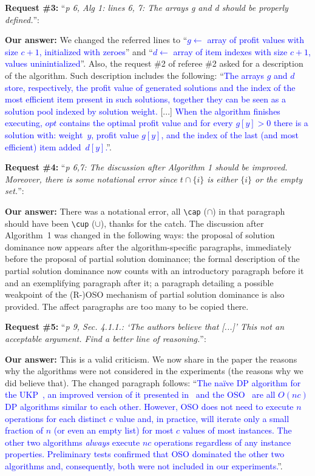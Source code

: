 \documentclass{elsarticle}
\begin{document}
\textbf{Request \#3:} ``\textit{p 6, Alg 1: lines 6, 7: The arrays g and d should be properly defined.}'':

\textbf{Our answer:} We changed the referred lines to ``\textcolor{blue}{\(g \leftarrow\) array of profit values with size \(c + 1\), initialized with zeroes}'' and ``\textcolor{blue}{\(d \leftarrow\) array of item indexes with size \(c + 1\), values uninintialized}''.
Also, the request \#2 of referee \#2 asked for a description of the algorithm.
Such description includes the following: ``\textcolor{blue}{The arrays \(g\) and \(d\) store, respectively, the profit value of generated solutions and the index of the most efficient item present in such solutions, together they can be seen as a solution pool indexed by solution weight.} [...] \textcolor{blue}{When the algorithm finishes executing, \(opt\) contains the optimal profit value and for every \(g[y] > 0\) there is a solution with: weight~\(y\), profit value \(g[y]\), and the index of the last (and most efficient) item added~\(d[y]\).}''.
\medskip

\textbf{Request \#4:} ``\textit{p 6,7: The discussion after Algorithm 1 should be improved. Moreover, there is some notational error since \(t \cap \{i\}\)  is either \(\{i\}\) or the empty set.}'':

\textbf{Our answer:} There was a notational error, all \verb+\cap+ (\(\cap\)) in that paragraph should have been \verb+\cup+ (\(\cup\)), thanks for the catch. The discussion after Algorithm~1 was changed in the following ways: the proposal of solution dominance now appears after the algorithm-specific paragraphs, immediately before the proposal of partial solution dominance; the formal description of the partial solution dominance now counts with an introductory paragraph before it and an exemplifying paragraph after it; a paragraph detailing a possible weakpoint of the (R-)OSO mechanism of partial solution dominance is also provided. The affect paragraphs are too many to be copied there.
\medskip

\textbf{Request \#5:} ``\textit{p 9, Sec. 4.1.1.: `The authors believe that [...]' This not an acceptable argument. Find a better line of reasoning.}'':

\textbf{Our answer:} This is a valid criticism.
We now share in the paper the reasons why the algorithms were not considered in the experiments (the reasons why we did believe that).
The changed paragraph follows: ``\textcolor{blue}{The naïve DP algorithm for the UKP~\cite[p.~311]{tchu}, an improved version of it presented in~\cite[p.~221]{garfinkel} and the OSO~\cite[p.~15]{gg-66} are all \(O(nc)\) DP algorithms similar to each other. %
However, OSO does not need to execute \(n\) operations for each distinct \(c\) value and, in practice, will iterate only a small fraction of \(n\) (or even an empty list) for most \(c\) values of most instances.
The other two algorithms \emph{always} execute \(nc\) operations regardless of any instance properties.
Preliminary tests confirmed that OSO dominated the other two algorithms and, consequently, both were not included in our experiments.}''.
\medskip
\end{document}
